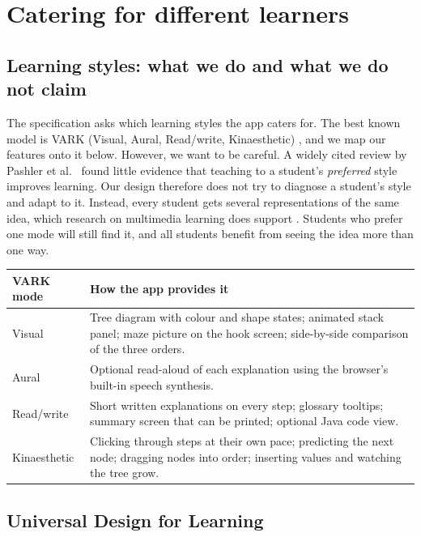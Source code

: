 \documentclass[11pt,a4paper]{article}
\begin{document}
\section{Catering for different learners}
\label{sec:styles}

\subsection{Learning styles: what we do and what we do not claim}

The specification asks which learning styles the app caters for. The best known model is VARK
(Visual, Aural, Read/write, Kinaesthetic) \cite{fleming1992}, and we map our features onto it below.
However, we want to be careful. A widely cited review by Pashler et al.\ \cite{pashler2008} found
little evidence that teaching to a student's \emph{preferred} style improves learning. Our design
therefore does not try to diagnose a student's style and adapt to it. Instead, every student gets
several representations of the same idea, which research on multimedia learning does support
\cite{mayer2009}. Students who prefer one mode will still find it, and all students benefit from
seeing the idea more than one way.

\begin{longtable}{@{}p{2.6cm} p{12.2cm}@{}}
  \toprule
  \textbf{VARK mode} & \textbf{How the app provides it} \\
  \midrule
  \endhead
  Visual & Tree diagram with colour and shape states; animated stack panel; maze picture on the
           hook screen; side-by-side comparison of the three orders. \\
  Aural & Optional read-aloud of each explanation using the browser's built-in speech
          synthesis. \\
  Read/write & Short written explanations on every step; glossary tooltips; summary screen that
               can be printed; optional Java code view. \\
  Kinaesthetic & Clicking through steps at their own pace; predicting the next node; dragging
                 nodes into order; inserting values and watching the tree grow. \\
  \bottomrule
\end{longtable}

\subsection{Universal Design for Learning}
\end{document}
